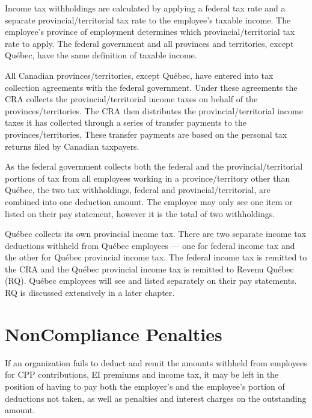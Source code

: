\documentclass[letterpaper,10pt,english]{sphinxmanual}
\begin{document}
\sphinxAtStartPar
Income tax withholdings are calculated by applying a federal tax rate and a separate
provincial/territorial tax rate to the employee’s taxable income. The employee’s province of
employment determines which provincial/territorial tax rate to apply. The federal
government and all provinces and territories, except Québec, have the same definition of
taxable income.

\sphinxAtStartPar
All Canadian provinces/territories, except Québec, have entered into tax collection
agreements with the federal government. Under these agreements the CRA collects the
provincial/territorial income taxes on behalf of the provinces/territories. The CRA then
distributes the provincial/territorial income taxes it has collected through a series of transfer
payments to the provinces/territories. These transfer payments are based on the personal tax
returns filed by Canadian taxpayers.

\sphinxAtStartPar
As the federal government collects both the federal and the provincial/territorial portions of
tax from all employees working in a province/territory other than Québec, the two tax
withholdings, federal and provincial/territorial, are combined into one deduction amount. The
employee may only see one item  or  listed on their pay
statement, however it is the total of two withholdings.

\sphinxAtStartPar
Québec collects its own provincial income tax. There are two separate income tax deductions
withheld from Québec employees — one for federal income tax and the other for Québec
provincial income tax. The federal income tax is remitted to the CRA and the Québec
provincial income tax is remitted to Revenu Québec (RQ). Québec employees will see
 and  listed separately on their pay statements.
RQ is discussed extensively in a later chapter.


\section{Non\sphinxhyphen{}Compliance Penalties}
\label{\detokenize{2_compliance:non-compliance-penalties}}
\sphinxAtStartPar
If an organization fails to deduct and remit the amounts withheld from employees for CPP
contributions, EI premiums and income tax, it may be left in the position of having to pay
both the employer’s and the employee’s portion of deductions not taken, as well as penalties
and interest charges on the outstanding amount.
\end{document}
